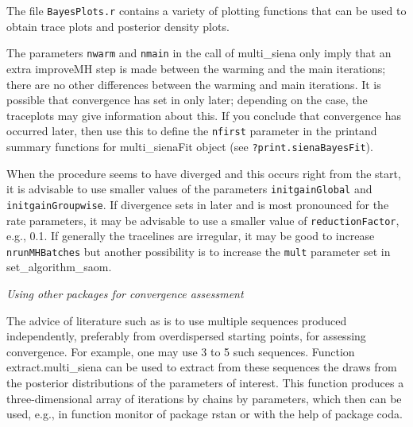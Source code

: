 \documentclass[a4paper,fleqn,11pt]{article}
\newcommand{\+}{\, + \,}
\newcommand{\sfn}[1]{\textsf{#1}}
\begin{document}
The file \texttt{BayesPlots.r} contains a variety of plotting functions that
can be used to obtain trace plots and posterior density plots.

The parameters \texttt{nwarm} and \texttt{nmain} in the call of
\textsf{multi\_siena} only imply
that an extra \sfn{improveMH} step is made between the warming and the
main iterations; there are no other differences between the warming
and main iterations. It is possible that convergence has set in only
later; depending on the case, the traceplots may give information about this.
If you conclude that convergence has occurred later, then use this to
define the \texttt{nfirst} parameter in the \textsf{print}and
\textsf{summary} functions for
\sfn{multi\_sienaFit} object (see \texttt{?print.sienaBayesFit}).

When the procedure seems to have diverged and this occurs right
from the start, it is
advisable to use smaller values of the parameters \texttt{initgainGlobal}
and \texttt{initgainGroupwise}.
If divergence sets in later and is most pronounced
for the rate parameters, it may be advisable to use a smaller value of
\texttt{reductionFactor}, e.g., 0.1.
If generally the tracelines are irregular, it may be good to increase
\texttt{nrunMHBatches} but another possibility is to increase
the \texttt{mult} parameter set in \sfn{set\_algorithm\_saom}.

\medskip

\noindent
\emph{Using other packages for convergence assessment}
\smallskip

\noindent
The advice of literature such as \citet{BDA3} is to use multiple
sequences produced independently, preferably from overdispersed
starting points, for assessing convergence.
For example, one may use 3 to 5 such sequences.
Function \sfn{extract.multi\_siena} can be used to extract
from these sequences the draws from the posterior distributions
of the parameters of interest.
This function produces a three-dimensional array of
iterations by chains by parameters, which then can be used, e.g., in
function \sfn{monitor} of package \sfn{rstan} or with the
help of package \sfn{coda}.
\end{document}
